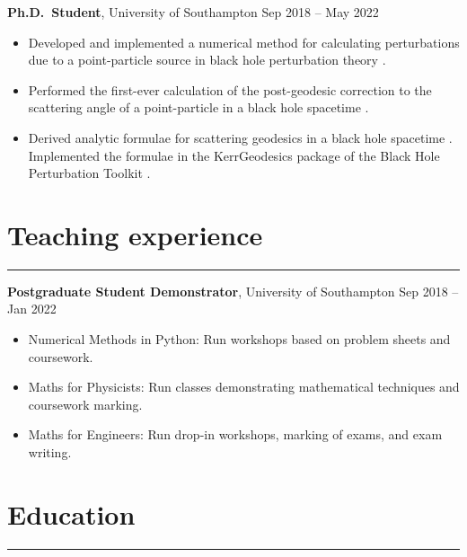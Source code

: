 \documentclass[10.5pt, oneside]{article}   	%
\begin{document}
\textbf{Ph.D.\ Student}, University of Southampton \hfill Sep 2018 -- May 2022\\ 
\vspace{-5mm}
\begin{itemize}
\item Developed and implemented a numerical method for calculating perturbations due to a point-particle source in black hole perturbation theory \cite{Barack:2022pde,Long:2021ufh}.
\item Performed the first-ever calculation of the post-geodesic correction to the scattering angle of a point-particle in a black hole spacetime \cite{Barack:2022pde}.
\item Derived analytic formulae for scattering geodesics in a black hole spacetime \cite{Long:2021ufh}. Implemented the formulae in the KerrGeodesics package of the Black Hole Perturbation Toolkit \cite{BHPT:prep}.
\end{itemize}


{\color{Sectioncolour}
\section*{Teaching experience}
\vspace{-3mm}
\noindent\rule{\linewidth}{0.6pt}}

\textbf{Postgraduate Student Demonstrator}, University of Southampton \hfill Sep 2018 -- Jan 2022\\ \vspace{-5mm}
\begin{itemize}
\item Numerical Methods in Python: Run workshops based on problem sheets and coursework.
\item Maths for Physicists: Run classes demonstrating mathematical techniques and coursework marking.
\item Maths for Engineers: Run drop-in workshops, marking of exams, and exam writing.
\end{itemize}


{\color{Sectioncolour}
\section*{Education}
\vspace{-3mm}
\noindent\rule{\linewidth}{0.6pt}}
\end{document}
